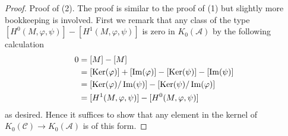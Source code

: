 \begin{proof}
\medskip\noindent
Proof of (2). The proof is similar to the proof of (1) but slightly
more bookkeeping is involved. First we remark that any class of the type
$[H^0(M, \varphi, \psi)] - [H^1(M, \varphi, \psi)]$ is zero
in $K_0(\mathcal{A})$ by the following calculation
\begin{align*}
0 & = [M] - [M] \\
& =  [\mathop{\mathrm{Ker}}(\varphi)] + [\mathop{\mathrm{Im}}(\varphi)]
- [\mathop{\mathrm{Ker}}(\psi)] - [\mathop{\mathrm{Im}}(\psi)] \\
& =
[\mathop{\mathrm{Ker}}(\varphi)/\mathop{\mathrm{Im}}(\psi)] -
[\mathop{\mathrm{Ker}}(\psi)/\mathop{\mathrm{Im}}(\varphi)] \\
& = [H^1(M, \varphi, \psi)] - [H^0(M, \varphi, \psi)]
\end{align*}
as desired. Hence it suffices to show that any element in the kernel
of $K_0(\mathcal{C}) \to K_0(\mathcal{A})$ is of this form.


\end{proof}
